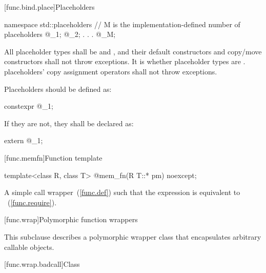 [func.bind.place]{Placeholders}

%
%
\begin{codeblock}
namespace std::placeholders {
  // M is the implementation-defined number of placeholders
  @\seebelow@ _1;
  @\seebelow@ _2;
              .
              .
              .
  @\seebelow@ _M;
}
\end{codeblock}

\pnum
All placeholder types shall be  and
, and their default constructors and copy/move
constructors shall not throw exceptions. It is  whether
placeholder types are .  placeholders' copy
assignment operators shall not throw exceptions.%
%

\pnum
Placeholders should be defined as:
\begin{codeblock}
constexpr @\unspec@ _1{};
\end{codeblock}
If they are not, they shall be declared as:
\begin{codeblock}
extern @\unspec@ _1;
\end{codeblock}

[func.memfn]{Function template }%

%
\begin{itemdecl}
template<class R, class T> @\unspec@ mem_fn(R T::* pm) noexcept;
\end{itemdecl}

\begin{itemdescr}
\pnum
\returns A simple call wrapper~(\ref{func.def}) 
such that the expression  is equivalent
to ~(\ref{func.require}).
\end{itemdescr}

[func.wrap]{Polymorphic function wrappers}%

\pnum
This subclause describes a polymorphic wrapper class that
encapsulates arbitrary callable objects.

[func.wrap.badcall]{Class }%
%

